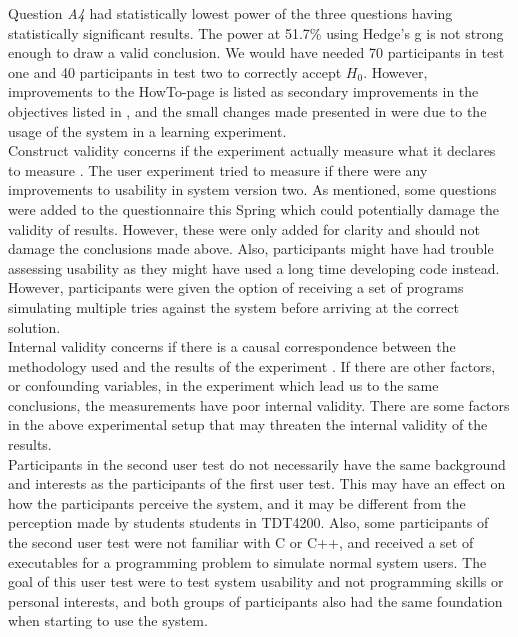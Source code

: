 Question \textit{A4} had statistically lowest power of the three questions having statistically significant results. The power at 51.7\% using Hedge's g is not strong enough to draw a valid conclusion. We would have needed 70 participants in test one and 40 participants in test two to correctly accept $H_0$. However, improvements to the HowTo-page is listed as secondary improvements in the objectives listed in , and the small changes made presented in  were due to the usage of the system in a learning experiment. \\

Construct validity concerns if the experiment actually measure what it declares to measure \cite{Cronbach1955}. The user experiment tried to measure if there were any improvements to usability in system version two. As mentioned, some questions were added to the questionnaire this Spring which could potentially damage the validity of results. However, these were only added for clarity and should not damage the conclusions made above. Also, participants might have had trouble assessing usability as they might have used a long time developing code instead. However, participants were given the option of receiving a set of programs simulating multiple tries against the system before arriving at the correct solution. \\

Internal validity concerns if there is a causal correspondence between the methodology used and the results of the experiment \cite{Oates2006}. If there are other factors, or confounding variables, in the experiment which lead us to the same conclusions, the measurements have poor internal validity. There are some factors in the above experimental setup that may threaten the internal validity of the results. \\

Participants in the second user test do not necessarily have the same background and interests as the participants of the first user test. This may have an effect on how the participants perceive the system, and it may be different from the perception made by students students in TDT4200. Also, some participants of the second user test were not familiar with C or C++, and received a set of executables for a programming problem to simulate normal system users. The goal of this user test were to test system usability and not programming skills or personal interests, and both groups of participants also had the same foundation when starting to use the system.  \\

